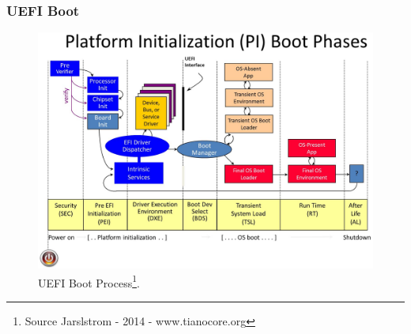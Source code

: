 \documentclass[xcolor=table, notheorems, hyperref={pdfpagelabels=false}]{beamer}
\begin{document}
\begin{frame}
\frametitle{UEFI Boot}
\begin{figure}
\includegraphics[width=0.7\linewidth]{os03-Jarlstrom-2014-PI-Boot-Phases-tianocore-org}
\caption{UEFI Boot Process\footnote{
Source Jarslstrom - 2014 - www.tianocore.org}.}
\end{figure}
\end{frame}

\end{document}
